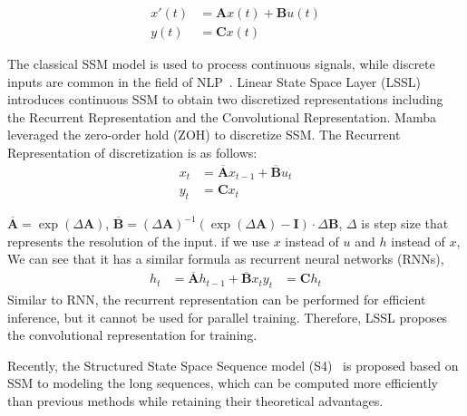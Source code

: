 \documentclass[11pt, a4paper, logo, copyright, nonumbering]{map}
\begin{document}
\begin{equation}
\begin{aligned}
x'(t) &=\mathbf{A}x(t)+\mathbf{B}u(t) \\
y(t) &=\mathbf{C}x(t)
\label{eq:simple_ssm}
\end{aligned}
\end{equation}


The classical SSM model is used to process continuous signals, while discrete inputs are common in the field of NLP~\cite{gu2021combining}. Linear State Space Layer (LSSL) introduces continuous SSM  to obtain two discretized representations including the Recurrent Representation and the Convolutional Representation.
Mamba~\citep{gu2023mamba} leveraged the zero-order hold (ZOH) to discretize SSM. The Recurrent Representation of discretization is as follows:
\begin{equation}
\begin{aligned}
x_t &=\overline{\mathbf{A}}x_{t-1}+\overline{\mathbf{B}}u_t\\
y_t &=\mathbf{C}x_t
\label{eq:ssm}
\end{aligned}
\end{equation}

$\overline{\mathbf{A}}=\exp(\Delta \mathbf{A})$, $\overline{\mathbf{B}}=(\Delta \mathbf{A})^{-1}(\exp(\Delta \mathbf{A}) - \mathbf{I})\cdot \Delta \mathbf{B}$, $\Delta$ is step size that represents the resolution of the input. if we use $x$ instead of $u$  and $h$ instead of $x$, We can see that it has a similar formula as recurrent neural networks (RNNs),
\begin{equation}
\begin{aligned}
h_t&=\overline{\mathbf{A}}h_{t-1}+\overline{\mathbf{B}}x_t
y_t&=\mathbf{C}h_t
\label{eq:ssmaaa}
\end{aligned}
\end{equation}
Similar to RNN, the recurrent representation can be performed for efficient inference, but it cannot be used for parallel training. Therefore, LSSL proposes the convolutional representation for training.






Recently, the Structured State Space Sequence model (S4)~\citep{gu2022efficiently} is proposed based on SSM to modeling the  long sequences,
which can be computed more efficiently than previous methods while retaining their theoretical advantages. 
\end{document}
